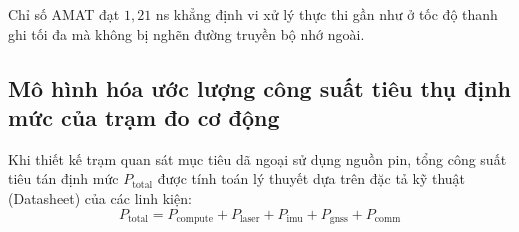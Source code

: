 \begin{table}[H]
\centering
\caption{Phân tích lý thuyết thời gian truy cập bộ nhớ trung bình giữa các kiến trúc giải thuật bám bắt}
\label{tab:amat-comparison-table-w12}
\end{table}

Chỉ số AMAT đạt $1{,}21$ ns khẳng định vi xử lý thực thi gần như ở tốc độ thanh ghi tối đa mà không bị nghẽn đường truyền bộ nhớ ngoài.

\subsection{Mô hình hóa ước lượng công suất tiêu thụ định mức của trạm đo cơ động}

\hspace{0.5cm} Khi thiết kế trạm quan sát mục tiêu dã ngoại sử dụng nguồn pin, tổng công suất tiêu tán định mức $P_{\text{total}}$ được tính toán lý thuyết dựa trên đặc tả kỹ thuật (Datasheet) của các linh kiện:
\begin{equation}
P_{\text{total}} = P_{\text{compute}} + P_{\text{laser}} + P_{\text{imu}} + P_{\text{gnss}} + P_{\text{comm}}
\label{eq:power-budget-formula-w12}
\end{equation}

